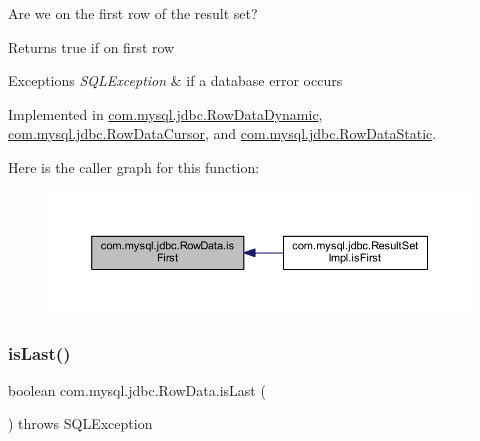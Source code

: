 Are we on the first row of the result set?

\begin{DoxyReturn}{Returns}
true if on first row 
\end{DoxyReturn}

\begin{DoxyExceptions}{Exceptions}
{\em S\+Q\+L\+Exception} & if a database error occurs \\
\hline
\end{DoxyExceptions}


Implemented in \mbox{\hyperlink{classcom_1_1mysql_1_1jdbc_1_1_row_data_dynamic_a7f7a86fb22556f5ed0fdb8a115008c83}{com.\+mysql.\+jdbc.\+Row\+Data\+Dynamic}}, \mbox{\hyperlink{classcom_1_1mysql_1_1jdbc_1_1_row_data_cursor_a6df7eb0ab6cebd6c865d86bee9b43d7f}{com.\+mysql.\+jdbc.\+Row\+Data\+Cursor}}, and \mbox{\hyperlink{classcom_1_1mysql_1_1jdbc_1_1_row_data_static_a8e4c2612d743e8d39f6434627cc156cd}{com.\+mysql.\+jdbc.\+Row\+Data\+Static}}.

Here is the caller graph for this function\+:
\nopagebreak
\begin{figure}[H]
\begin{center}
\leavevmode
\includegraphics[width=350pt]{interfacecom_1_1mysql_1_1jdbc_1_1_row_data_a4bcee2924cecb7f100d887963d6b5b70_icgraph}
\end{center}
\end{figure}
\mbox{\label{interfacecom_1_1mysql_1_1jdbc_1_1_row_data_a372c70885e7272deb3ad84fefb75eebb}} 
\subsubsection{\texorpdfstring{is\+Last()}{isLast()}}
{\footnotesize\ttfamily boolean com.\+mysql.\+jdbc.\+Row\+Data.\+is\+Last (\begin{DoxyParamCaption}{ }\end{DoxyParamCaption}) throws S\+Q\+L\+Exception}


